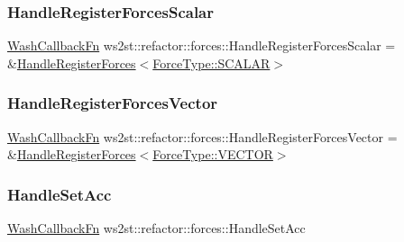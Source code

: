 \subsubsection{\texorpdfstring{Handle\+Register\+Forces\+Scalar}{HandleRegisterForcesScalar}}
{\footnotesize\ttfamily \mbox{\hyperlink{namespacews2st_a682dfda40d8282c7e579a7b826a7d861}{Wash\+Callback\+Fn}} ws2st\+::refactor\+::forces\+::\+Handle\+Register\+Forces\+Scalar = \&\mbox{\hyperlink{namespacews2st_1_1refactor_1_1forces_af8c67c569ff62996a8e4f0d62b29c6a3}{Handle\+Register\+Forces}}$<$\mbox{\hyperlink{namespacews2st_a6f0a66f31a77eae4630693b8d4d27a05a8f3d9a4b6a7b7f2c7afa61ca113d0db9}{Force\+Type\+::\+S\+C\+A\+L\+AR}}$>$}

\mbox{\label{namespacews2st_1_1refactor_1_1forces_a4f8af8cb0d6a0af0f29e1d887486c612}} 
\subsubsection{\texorpdfstring{Handle\+Register\+Forces\+Vector}{HandleRegisterForcesVector}}
{\footnotesize\ttfamily \mbox{\hyperlink{namespacews2st_a682dfda40d8282c7e579a7b826a7d861}{Wash\+Callback\+Fn}} ws2st\+::refactor\+::forces\+::\+Handle\+Register\+Forces\+Vector = \&\mbox{\hyperlink{namespacews2st_1_1refactor_1_1forces_af8c67c569ff62996a8e4f0d62b29c6a3}{Handle\+Register\+Forces}}$<$\mbox{\hyperlink{namespacews2st_a6f0a66f31a77eae4630693b8d4d27a05a87752381b583740610f1dfeb07fdad7e}{Force\+Type\+::\+V\+E\+C\+T\+OR}}$>$}

\mbox{\label{namespacews2st_1_1refactor_1_1forces_aac8387c5a35d43be7a798e5b8cc9890b}} 
\subsubsection{\texorpdfstring{Handle\+Set\+Acc}{HandleSetAcc}}
{\footnotesize\ttfamily \mbox{\hyperlink{namespacews2st_a682dfda40d8282c7e579a7b826a7d861}{Wash\+Callback\+Fn}} ws2st\+::refactor\+::forces\+::\+Handle\+Set\+Acc}

